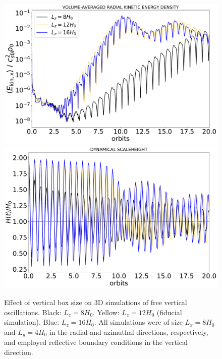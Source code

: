 \documentclass[fleqn,usenatbib]{mnras}
\begin{document}
\begin{figure}
\centering
\includegraphics[scale=0.25]{Figures/figure00PRODUCTION_VSTRHYDRORes32Re4687H4BouncezBCReflectiveLx8HComparison_timeevolution_volavg_kineticenergydensity_xcomp.pdf}
\includegraphics[scale=0.25]{Figures/figure00PRODUCTION_VSTRHYDRORes32Re4687H4BouncezBCReflectiveLx8HComparison_timeevolution_dynamicalH.pdf}
\caption{Effect of vertical box size on 3D simulations of free vertical oscillations. Black: $L_z = 8H_0$. Yellow: $L_z = 12H_0$ (fiducial simulation). Blue: $L_z = 16H_0$. All simulations were of size $L_x = 8H_0$ and $L_y = 4H_0$ in the radial and azimuthal directions, respectively, and employed reflective boundary conditions in the vertical direction.}
\label{FIGURE_FreeBounceVerticalBoxSizeComparison}
\end{figure}
\end{document}
